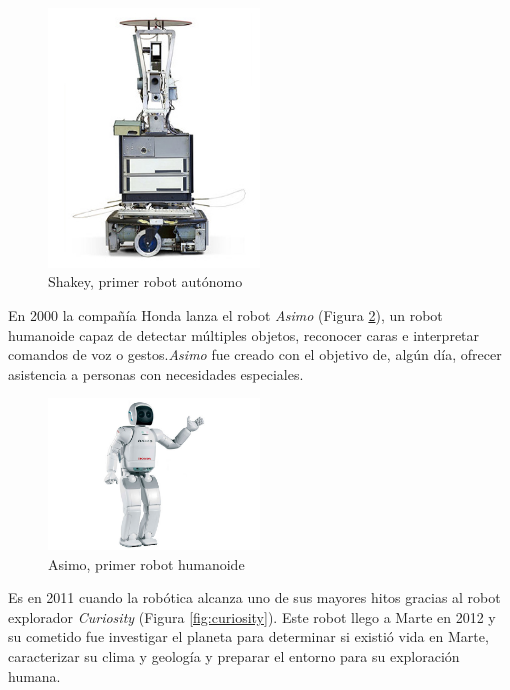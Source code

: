 \begin{figure}[H]
\centering
\includegraphics[width=0.5\textwidth]{img/shakey.jpg}
\caption{Shakey, primer robot autónomo} \label{fig:shakey}
\end{figure}

En 2000 la compañía Honda lanza el robot \textit{Asimo} (Figura \ref{fig:asimo}), un robot humanoide capaz de detectar múltiples objetos, reconocer caras e interpretar comandos de voz o gestos.\textit{Asimo} fue creado con el objetivo de, algún día, ofrecer asistencia a personas con necesidades especiales. 

\begin{figure}[H]
\centering
\includegraphics[width=0.5\textwidth]{img/asimo-honda.jpg}
\caption{Asimo, primer robot humanoide} \label{fig:asimo}
\end{figure}

Es en 2011 cuando la robótica alcanza uno de sus mayores hitos gracias al robot explorador \textit{Curiosity} (Figura \ref{fig:curiosity}). Este robot llego a Marte en 2012 y su cometido fue investigar el planeta para determinar si existió vida en Marte, caracterizar su clima y geología y preparar el entorno para su exploración humana. 

